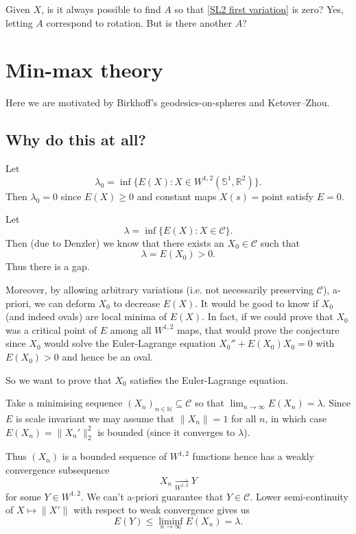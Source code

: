 \documentclass[12pt, a4paper]{amsart}
\theoremstyle{remark}
\newcommand{\R}{\mathbb{R}}
\newcommand{\So}{\mathbb{S}^1}
\begin{document}
Given $X$, is it always possible to find $A$ so that \eqref{SL2 first variation} is zero?  Yes, letting $A$ correspond to rotation.  But is there another $A$?

\newpage
\section*{Min-max theory}

Here we are motivated by Birkhoff's geodesics-on-spheres and Ketover--Zhou.   

\subsection*{Why do this at all?}

Let
\[
\lambda_0 = \inf \lbrace E(X) : X \in W^{1,2}(\So, \R^2) \rbrace.
\]
Then \(\lambda_0 = 0\) since \(E(X) \geq 0\) and constant maps \(X(s) = \text{point}\) satisfy \(E = 0\).

Let
\[
\lambda = \inf \lbrace E(X) : X \in \mathcal{C} \rbrace.
\]
Then (due to Denzler) we know that there exists an \(X_0 \in \mathcal{C}\) such that
\[
\lambda = E(X_0) > 0.
\]
Thus there is a gap.

Moreover, by allowing arbitrary variations (i.e. not necessarily preserving \(\mathcal{C}\)), a-priori, we can deform \(X_0\) to decrease \(E(X)\). It would be good to know if \(X_0\) (and indeed ovals) are local minima of \(E(X)\). In fact, if we could prove that \(X_0\) was a critical point of \(E\) among all \(W^{1,2}\) maps, that would prove the conjecture since \(X_0\) would solve the Euler-Lagrange equation \(X_0'' + E(X_0) X_0 = 0\) with \(E(X_0) > 0\) and hence be an oval.

So we want to prove that \(X_0\) satisfies the Euler-Lagrange equation.

Take a minimising sequence \((X_n)_{n\in \mathbb{N}} \subseteq \mathcal{C}\) so that \(\lim_{n\to \infty} E(X_n) = \lambda\). Since \(E\) is scale invariant we may assume that \(\|X_n\| = 1\) for all \(n\), in which case \(E(X_n) = \|X_n'\|_2^2\) is bounded (since it converges to \(\lambda\)).

Thus \((X_n)\) is a bounded sequence of \(W^{1,2}\) functions hence has a weakly convergence subsequence
\[
X_n \underset{{W^{1,2}}}{\rightharpoonup} Y
\]
for some \(Y \in W^{1,2}\). We can't a-priori guarantee that \(Y \in \mathcal{C}\). Lower semi-continuity of \(X \mapsto \|X'\|\) with respect to weak convergence gives us
\[
E(Y) \leq \liminf_{n\to \infty} E(X_n) = \lambda.
\]
\end{document}
